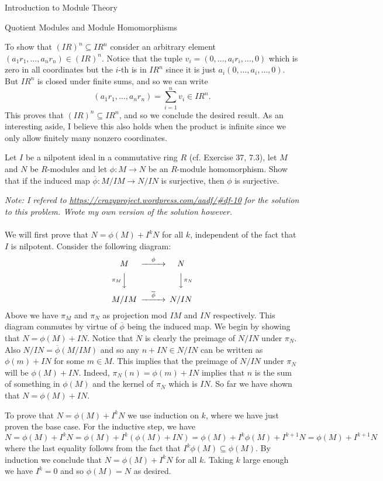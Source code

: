 \begin{chapter}{Introduction to Module Theory}
\begin{section}{Quotient Modules and Module Homomorphisms}
\begin{solution}
To show that $(IR)^n\subseteq IR^n$ consider an arbitrary element $(a_1r_1,\ldots, a_nr_n)\in (IR)^n$. Notice that the tuple $v_i = (0,\ldots, a_ir_i,\ldots, 0)$ which is zero in all coordinates but the $i$-th is in $IR^n$ since it is just $a_i(0,\ldots, a_i,\ldots, 0)$. But $IR^n$ is closed under finite sums, and so we can write \[
(a_1r_1,\ldots,a_nr_n) = \sum_{i=1}^n v_i  \in IR^n.
\]
This proves that $(IR)^n\subseteq IR^n$, and so we conclude the desired result. As an interesting aside, I believe this also holds when the product is infinite since we only allow finitely many nonzero coordinates.
\end{solution}\oneperpage



\begin{problem}\label{ex:10.2.13}
Let $I$ be a nilpotent ideal in a commutative ring $R$ (cf. Exercise 37, 7.3), let $M$ and $N$ be $R$-modules and let $\phi:M\to N$ be an $R$-module homomorphism. Show that if the induced map $\overline{\phi}:M/IM \to N/IN$ is surjective, then $\phi$ is surjective.
\end{problem}
\begin{solution}
\emph{Note: I refered to \url{https://crazyproject.wordpress.com/aadf/\#df-10} for the solution to this problem. Wrote my own version of the solution however.}\\\\
We will first prove that $N = \phi(M) + I^kN$ for all $k$, independent of the fact that $I$ is nilpotent. Consider the following diagram: \[
\begin{CD}
M @>\phi>> N\\
@V\pi_MVV @VV\pi_NV\\
M/IM @>\overline{\phi}>> N/IN
\end{CD}
\]
Above we have $\pi_M$ and $\pi_N$ as projection mod $IM$ and $IN$ respectively. This diagram commutes by virtue of $\overline{\phi}$ being the induced map. We begin by showing that $N = \phi(M) + IN$. Notice that $N$ is clearly the preimage of $N/IN$ under $\pi_N$. Also $N/IN = \overline{\phi}(M/IM)$ and so any $n+IN\in N/IN$ can be written as $\phi(m) + IN$ for some $m\in M$. This implies that the preimage of $N/IN$ under $\pi_N$ will be $\phi(M) + IN$. Indeed, $\pi_N(n)  = \phi(m)+IN$ implies that $n$ is the sum of something in $\phi(M)$ and the kernel of $\pi_N$ which is $IN$. So far we have shown that $N = \phi(M) + IN$. 

To prove that $N = \phi(M) + I^kN$ we use induction on $k$, where we have just proven the base case. For the inductive step, we have\[
N = \phi(M) + I^kN = \phi(M) + I^k(\phi(M) + IN) = \phi(M) + I^k\phi(M) + I^{k+1}N = \phi(M) + I^{k+1}N
\]
where the last equality follows from the fact that $I^k\phi(M) \subseteq \phi(M)$. By induction we conclude that $N = \phi(M) + I^kN$ for all $k$. Taking $k$ large enough we have $I^k = 0$ and so $\phi(M) = N$ as desired. 


\end{solution}
\end{section}
\end{chapter}
